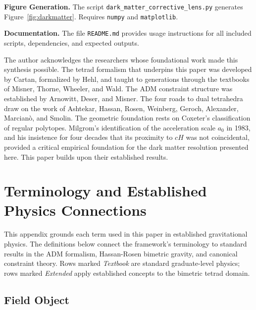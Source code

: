 \documentclass[aps,prd,preprint,superscriptaddress,showpacs,preprintnumbers,amsmath,amssymb,nofootinbib]{revtex4-2}
\begin{document}
\textbf{Figure Generation.}\quad
The script \texttt{dark\_matter\_corrective\_lens.py} generates Figure~\ref{fig:darkmatter}. Requires \texttt{numpy} and \texttt{matplotlib}.

\textbf{Documentation.}\quad
The file \texttt{README.md} provides usage instructions for all included scripts, dependencies, and expected outputs.

\begin{acknowledgments}
The author acknowledges the researchers whose foundational work made this synthesis possible. The tetrad formalism that underpins this paper was developed by Cartan, formalized by Hehl, and taught to generations through the textbooks of Misner, Thorne, Wheeler, and Wald. The ADM constraint structure was established by Arnowitt, Deser, and Misner. The four roads to dual tetrahedra draw on the work of Ashtekar, Hassan, Rosen, Weinberg, Geroch, Alexander, Marcian\`o, and Smolin. The geometric foundation rests on Coxeter's classification of regular polytopes. Milgrom's identification of the acceleration scale $a_0$ in 1983, and his insistence for four decades that its proximity to $cH$ was not coincidental, provided a critical empirical foundation for the dark matter resolution presented here. This paper builds upon their established results.
\end{acknowledgments}

\appendix
\section{Terminology and Established Physics Connections}
\label{app:terminology}

This appendix grounds each term used in this paper in established gravitational physics. The definitions below connect the framework's terminology to standard results in the ADM formalism, Hassan-Rosen bimetric gravity, and canonical constraint theory. Rows marked \emph{Textbook} are standard graduate-level physics; rows marked \emph{Extended} apply established concepts to the bimetric tetrad domain.

\subsection*{Field Object}
\end{document}
